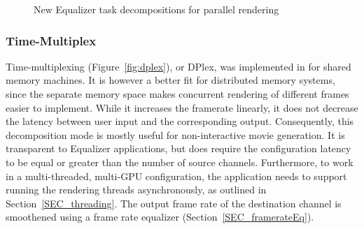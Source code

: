 \documentclass[10pt,journal,compsoc]{IEEEtran}
\newcommand{\sref}[1]{Section~\ref{#1}}
\newcommand{\fig}[1]{Figure~\ref{#1}}
\begin{document}
\begin{figure}[ht]\center
  \hfil
  \hfil
  \hfil
  \hfil
  \caption{New Equalizer task decompositions for parallel rendering}
  \label{fig:compounds}
\end{figure}


\subsubsection{Time-Multiplex}

Time-multiplexing (\fig{fig:dplex}), or DPlex, was implemented in \cite{BRE:05}
for shared memory machines. It is however a better fit for distributed memory
systems, since the separate memory space makes concurrent rendering of different
frames easier to implement. While it increases the framerate linearly, it does
not decrease the latency between user input and the corresponding
output. Consequently, this decomposition mode is mostly useful for
non-interactive movie generation. It is transparent to Equalizer applications,
but does require the configuration latency to be equal or greater than the
number of source channels. Furthermore, to work in a multi-threaded, multi-GPU
configuration, the application needs to support running the rendering threads
asynchronously, as outlined in \sref{SEC_threading}. The output frame rate of
the destination channel is smoothened using a frame rate equalizer
(\sref{SEC_framerateEq}).
\end{document}
